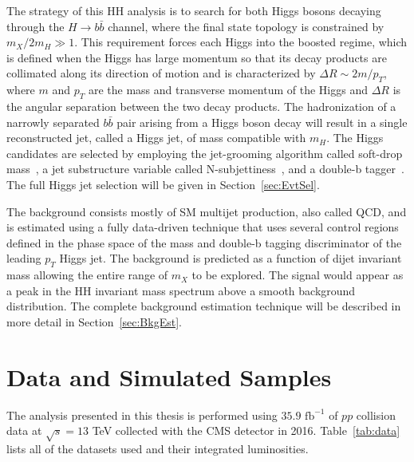 
The strategy of this HH analysis is to search for both Higgs bosons decaying through the $H\rightarrow b\bar{b}$ channel, where the final state topology is constrained by $m_{X}/2m_{H}\gg 1$. This requirement forces each Higgs into the boosted regime, which is defined when the Higgs has large momentum so that its decay products are collimated along its direction of motion and is characterized by $\Delta R \sim 2m/p_{T}$, where $m$ and $p_{T}$ are the mass and transverse momentum of the Higgs and $\Delta R$ is the angular separation between the two decay products. The hadronization of a narrowly separated $b\bar{b}$ pair arising from a Higgs boson decay will result in a single reconstructed jet, called a Higgs jet, of mass compatible with $m_{H}$. The Higgs candidates are selected by employing the jet-grooming algorithm called soft-drop mass~\cite{JetMass, SoftDrop}, a jet substructure variable called N-subjettiness~\cite{BoostNsub, BoostTop}, and a double-b tagger~\cite{DoubleB}. The full Higgs jet selection will be given in Section~\ref{sec:EvtSel}.

The background consists mostly of SM multijet production, also called QCD, and is estimated using a fully data-driven technique that uses several control regions defined in the phase space of the mass and double-b tagging discriminator of the leading $p_{T}$ Higgs jet. The background is predicted as a function of dijet invariant mass allowing the entire range of $m_{X}$ to be explored. The signal would appear as a peak in the HH invariant mass spectrum above a smooth background distribution. The complete background estimation technique will be described in more detail in Section~\ref{sec:BkgEst}.

\section{Data and Simulated Samples}
\label{sec:Samples}

The analysis presented in this thesis is performed using $35.9$ $\mathrm{fb}^{-1}$ of $pp$ collision data at $\sqrt{s}=13$ TeV collected with the CMS detector in 2016. Table~\ref{tab:data} lists all of the datasets used and their integrated luminosities.

